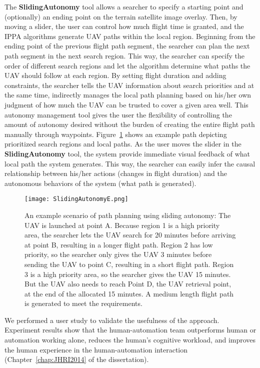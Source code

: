The \textbf{SlidingAutonomy} tool allows a searcher to specify a starting point and (optionally) an ending point on the terrain satellite image overlay. Then, by moving a slider, the user can control how much flight time is granted, and the IPPA algorithms generate UAV paths within the local region. Beginning from the ending point of the previous flight path segment, the searcher can plan the next path segment in the next search region. This way, the searcher can specify the order of different search regions and let the algorithm determine what paths the UAV should follow at each region. By setting flight duration and adding constraints, the searcher tells the UAV information about search priorities and at the same time, indirectly manages the local path planning based on his/her own judgment of how much the UAV can be trusted to cover a given area well. This autonomy management tool gives the user the flexibility of controlling the amount of autonomy desired without the burden of creating the entire flight path manually through waypoints. Figure~\ref{SlidingAutonomy} shows an example path depicting prioritized search regions and local paths. As the user moves the slider in the \textbf{SlidingAutonomy} tool, the system provide immediate visual feedback of what local path the system generates. This way, the searcher can easily infer the causal relationship between his/her actions (changes in flight duration) and the autonomous behaviors of the system (what path is generated). 

\begin{figure}
\centering
\texttt{[image: SlidingAutonomyE.png]}
\caption[An example scenario of path planning using sliding autonomy]{An example scenario of path planning using sliding autonomy: The UAV is launched at point A. Because region 1 is a high priority area, the searcher lets the UAV search for 20 minutes before arriving at point B, resulting in a longer flight path. Region 2 has low priority, so the searcher only gives the UAV 3 minutes before sending the UAV to point C, resulting in a short flight path. Region 3 is a high priority area, so the searcher gives the UAV 15 minutes. But the UAV also needs to reach Point D, the UAV retrieval point, at the end of the allocated 15 minutes. A medium length flight path is generated to meet the requirements.}
\label{SlidingAutonomy}
\end{figure}

We performed a user study to validate the usefulness of the approach. Experiment results show that the human-automation team outperforms human or automation working alone, reduces the human's cognitive workload, and improves the human experience in the human-automation interaction (Chapter~\ref{chap:JHRI2014} of the dissertation).


